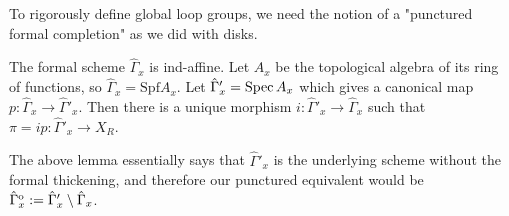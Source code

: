 \documentclass[12pt]{article}
\begin{document}
To rigorously define global loop groups, we need the notion of a "punctured formal completion" as we did with disks. 
\begin{lem}
    The formal scheme $\hat{\Gamma}_x$ is ind-affine. Let $A_x$ be the topological algebra of its ring of functions, so $\hat{\Gamma}_x = \mathrm{Spf} A_x$. Let $\hat{\Gamma}'_x = \operatorname{Spec} A_x$ which gives a canonical map $p \colon \hat{\Gamma}_x \to \hat{\Gamma}'_x$. Then there is a unique morphism $i \colon \hat{\Gamma}'_x \to \hat{\Gamma}_x$ such that $\pi = ip \colon \hat{\Gamma}'_x \to X_R$.
\end{lem}
The above lemma essentially says that $\hat{\Gamma}'_x$ is the underlying scheme without the formal thickening, and therefore our punctured equivalent would be $\hat{\Gamma}^{\mathrm{o}}_x := \hat{\Gamma}'_x \setminus \hat{\Gamma}_x$.
\end{document}
